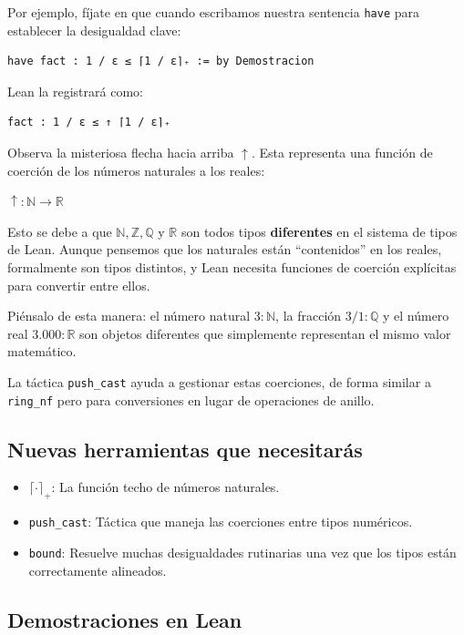Por ejemplo, fíjate en que cuando escribamos nuestra sentencia \texttt{have} para establecer la desigualdad clave:
\begin{verbatim}
have fact : 1 / ε ≤ ⌈1 / ε⌉₊ := by Demostracion
\end{verbatim}
Lean la registrará como:
\begin{verbatim}
fact : 1 / ε ≤ ↑ ⌈1 / ε⌉₊
\end{verbatim}
Observa la misteriosa flecha hacia arriba $\uparrow$. Esta representa una función de coerción de los números naturales a los reales:
\begin{center}
    $\uparrow : \mathbb{N} \to \mathbb{R}$
\end{center}
Esto se debe a que $\mathbb{N}, \mathbb{Z}, \mathbb{Q}$ y $\mathbb{R}$ son todos tipos \textbf{diferentes} en el sistema de tipos de Lean. Aunque pensemos que los naturales están ``contenidos'' en los reales, formalmente son tipos distintos, y Lean necesita funciones de coerción explícitas para convertir entre ellos.

Piénsalo de esta manera: el número natural $3 : \mathbb{N}$, la fracción $3/1 : \mathbb{Q}$ y el número real $3.000 : \mathbb{R}$ son objetos diferentes que simplemente representan el mismo valor matemático.

La táctica \texttt{push\_cast} ayuda a gestionar estas coerciones, de forma similar a \texttt{ring\_nf} pero para conversiones en lugar de operaciones de anillo.

\subsection{Nuevas herramientas que necesitarás}

\begin{itemize}
    \item $\lceil \cdot \rceil_+$: La función techo de números naturales.
    \item \texttt{push\_cast}: Táctica que maneja las coerciones entre tipos numéricos.
    \item \texttt{bound}: Resuelve muchas desigualdades rutinarias una vez que los tipos están correctamente alineados.
\end{itemize}

\subsection{Demostraciones en Lean}

